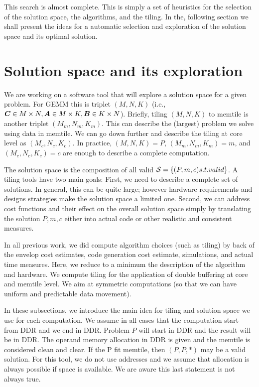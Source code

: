 \documentclass[conference]{IEEEtran}
\begin{document}
This search is almost complete. This is simply a set of heuristics for
the selection of the solution space, the algorithms, and the tiling.
In the, following section we shall present the ideas for a automatic
selection and exploration of the solution space and its optimal solution.




\section{Solution space and its exploration}
We are working on a software tool that will explore a solution space
for a given problem. For GEMM this is triplet $(M,N,K)$ (i.e., ${\boldsymbol C}
\in M \times N, {\boldsymbol A} \in M \times K, {\boldsymbol B} \in K \times N$). Briefly,
  tiling $(M,N,K)$ to memtile is another triplet $(M_m,N_m,K_m)$. This
  can describe the (largest) problem we solve using data in
  memtile. We can go down further and describe the tiling at core
  level as $(M_c,N_c,K_c)$. In practice, $(M,N,K)=P$,
  $(M_m,N_m,K_m)=m$, and $(M_c,N_c,K_c)=c$ are enough to describe a
  complete computation.

The solution space is the composition of all valid ${\cal S}= \{
(P,m,c) \mbox{ s.t. valid}\}$. A tiling tools have two main goals:
First, we need to describe a complete set of solutions. In general,
this can be quite large; however hardware requirements and designs
strategies make the solution space a limited one. Second, we can address
cost functions and their effect on the overall solution space simply
by translating the solution $P,m,c$ either into actual code or other
realistic and consistent measures.

In all previous work, we did compute algorithm choices (such as
tiling) by back of the envelop cost estimates, code generation cost
estimate, simulations, and actual time measures. Here, we reduce to a
minimum the description of the algorithm and hardware. We compute
tiling for the application of double buffering at core and memtile
level. We aim at symmetric computations (so that we can have uniform
and predictable data movement).

In these subsections, we introduce the main idea for tiling and
solution space we use for each computation. We assume in all cases
that the computation start from DDR and we end in DDR. Problem $P$
will start in DDR and the result will be in DDR. The operand memory
allocation in DDR is given and the memtile is considered clean and
clear. If the P fit memtile, then $(P,P,*)$ may be a valid
solution. For this tool, we do not use addresses and we assume that
allocation is always possible if space is available. We are aware this
last statement is not always true.
\end{document}
